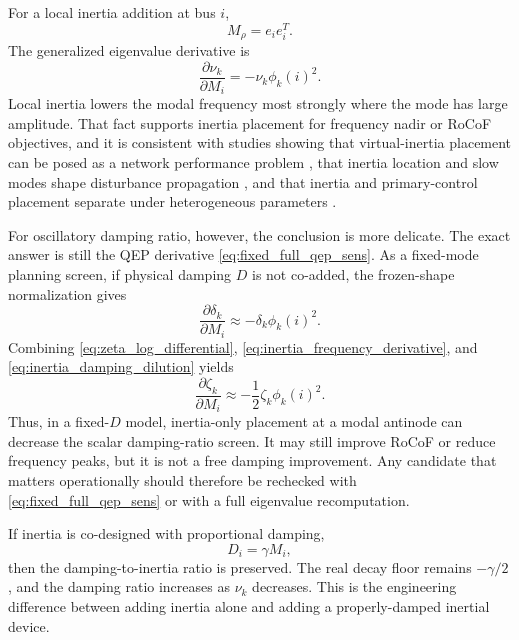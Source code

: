 For a local inertia addition at bus \(i\),
\begin{equation}
  M_\rho=e_ie_i^T.
\end{equation}
The generalized eigenvalue derivative is
\begin{equation}
  \frac{\partial\nu_k}{\partial M_i}
  =
  -\nu_k\phi_k(i)^2.
  \label{eq:inertia_frequency_derivative}
\end{equation}
Local inertia lowers the modal frequency most strongly where the mode has large
amplitude. That fact supports inertia placement for frequency nadir or RoCoF
objectives, and it is consistent with studies showing that virtual-inertia
placement can be posed as a network performance problem
\cite{poolla2017virtual}, that inertia location and slow modes shape
disturbance propagation \cite{pagnier2019inertia_location}, and that inertia
and primary-control placement separate under heterogeneous parameters
\cite{pagnier2019optimal}.

For oscillatory damping ratio, however, the conclusion is more delicate. The
exact answer is still the QEP derivative \eqref{eq:fixed_full_qep_sens}. As a
fixed-mode planning screen, if physical damping \(D\) is not co-added, the
frozen-shape normalization gives
\begin{equation}
  \frac{\partial\delta_k}{\partial M_i}
  \approx
  -\delta_k\phi_k(i)^2.
  \label{eq:inertia_damping_dilution}
\end{equation}
Combining \eqref{eq:zeta_log_differential},
\eqref{eq:inertia_frequency_derivative}, and
\eqref{eq:inertia_damping_dilution} yields
\begin{equation}
  \frac{\partial\zeta_k}{\partial M_i}
  \approx
  -\frac{1}{2}\zeta_k\phi_k(i)^2.
  \label{eq:inertia_zeta_dilution}
\end{equation}
Thus, in a fixed-\(D\) model, inertia-only placement at a modal antinode can
decrease the scalar damping-ratio screen. It may still improve RoCoF or reduce
frequency peaks, but it is not a free damping improvement. Any candidate that
matters operationally should therefore be rechecked with
\eqref{eq:fixed_full_qep_sens} or with a full eigenvalue recomputation.

If inertia is co-designed with proportional damping,
\begin{equation}
  D_i=\gamma M_i,
  \label{eq:co_designed_proportional}
\end{equation}
then the damping-to-inertia ratio is preserved. The real decay floor remains
\(-\gamma/2\), and the damping ratio increases as \(\nu_k\) decreases. This is
the engineering difference between adding inertia alone and adding a
properly-damped inertial device.

